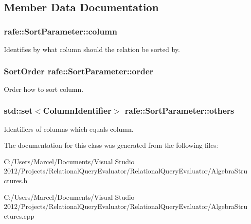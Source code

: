 \subsection{Member Data Documentation}
\hypertarget{classrafe_1_1_sort_parameter_ab28a61edbd40e46e55fac81024e5cdf8}{
\subsubsection[{column}]{ rafe\+::\+Sort\+Parameter\+::column}}\label{classrafe_1_1_sort_parameter_ab28a61edbd40e46e55fac81024e5cdf8}
Identifies by what column should the relation be sorted by. \hypertarget{classrafe_1_1_sort_parameter_ac4bb3225464a463206abfc4ef7a4a875}{
\subsubsection[{order}]{\setlength{\rightskip}{0pt plus 5cm}Sort\+Order rafe\+::\+Sort\+Parameter\+::order}}\label{classrafe_1_1_sort_parameter_ac4bb3225464a463206abfc4ef7a4a875}
Order how to sort column. \hypertarget{classrafe_1_1_sort_parameter_ae8a1dda682edec1b98e928590763ba85}{
\subsubsection[{others}]{\setlength{\rightskip}{0pt plus 5cm}std\+::set$<${\bf Column\+Identifier}$>$ rafe\+::\+Sort\+Parameter\+::others}}\label{classrafe_1_1_sort_parameter_ae8a1dda682edec1b98e928590763ba85}
Identifiers of columns which equals column. 

The documentation for this class was generated from the following files\+:\begin{DoxyCompactItemize}
\item 
C\+:/\+Users/\+Marcel/\+Documents/\+Visual Studio 2012/\+Projects/\+Relational\+Query\+Evaluator/\+Relational\+Query\+Evaluator/Algebra\+Structures.\+h\item 
C\+:/\+Users/\+Marcel/\+Documents/\+Visual Studio 2012/\+Projects/\+Relational\+Query\+Evaluator/\+Relational\+Query\+Evaluator/Algebra\+Structures.\+cpp\end{DoxyCompactItemize}
